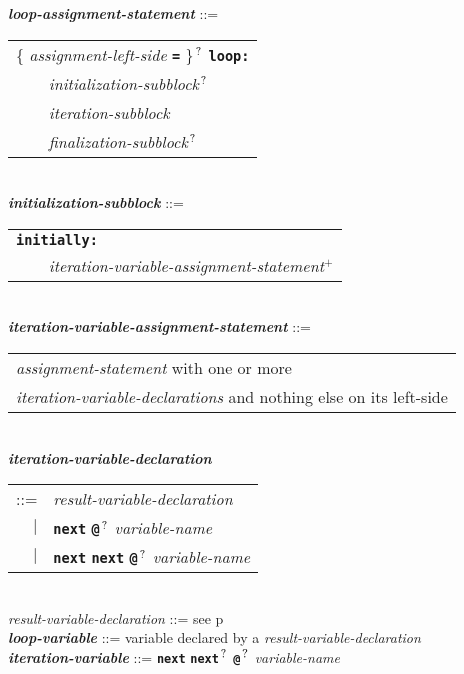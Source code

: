 \documentclass[12pt]{article}
\newcommand{\TT}[1]{{\tt \bfseries #1}}
\newcommand{\PLUS}[1][]{{$^{+#1}$}}
\newcommand{\QMARK}{{$^{\,\mbox{\footnotesize ?}}$}}
\newcommand{\ttkey}[1]{{\tt \bfseries #1}}
\newcommand{\emkey}[1]{{\em \bfseries #1}}
\newcommand{\pagref}[1]{p\pageref{#1}}
\newenvironment{indpar}[1][0.3in]%
	{\begin{list}{}%
		     {\setlength{\itemsep}{0in}%
		      \setlength{\topsep}{0in}%
		      \setlength{\parsep}{1ex}%
		      \setlength{\labelwidth}{#1}%
		      \setlength{\leftmargin}{#1}%
		      \addtolength{\leftmargin}{\labelsep}}%
	 \item}%
	{\end{list}}
\begin{document}
\begin{indpar}
\emkey{loop-assignment-statement} ::= \\
\hspace*{0.5in}\begin{tabular}[t]{l}
        \{ {\em assignment-left-side} \TT{=} \}\QMARK{} \ttkey{loop}\TT{:} \\
	\TT{~~~~}{\em initialization-subblock}\QMARK{} \\
	\TT{~~~~}{\em iteration-subblock} \\
	\TT{~~~~}{\em finalization-subblock}\QMARK{} \\
	\end{tabular}
\\[0.5ex]
\emkey{initialization-subblock} ::= \\
\hspace*{0.5in}\begin{tabular}[t]{l}
        \ttkey{initially}\TT{:} \\
	\TT{~~~~}{\em iteration-variable-assignment-statement}\PLUS{} \\
	\end{tabular} \\
\emkey{iteration-variable-assignment-statement} ::= \\
\hspace*{0.5in}\begin{tabular}[t]{l}
	{\em assignment-statement} with one or more \\
	{\em iteration-variable-declarations} and nothing else on its left-side
	\end{tabular} \\
\emkey{iteration-variable-declaration}
    \begin{tabular}[t]{rl}
    ::= & {\em result-variable-declaration} \\
    $|$ & \TT{next} \TT{@}\QMARK{} {\em variable-name} \\
    $|$ & \TT{next} \TT{next} \TT{@}\QMARK{} {\em variable-name} \\
    \end{tabular} \\
{\em result-variable-declaration} ::=
    see \pagref{RESULT-VARIABLE-DECLARATION}
\\[0.5ex]
\emkey{loop-variable} ::= variable declared by a
			{\em result-variable-declaration}
\\[0.5ex]
\emkey{iteration-variable}\label{ITERATION-VARIABLE} ::= 
    \TT{next} \TT{next}\QMARK{} \TT{@}\QMARK{} {\em variable-name}
\\[0.5ex]

\end{indpar}
\end{document}
